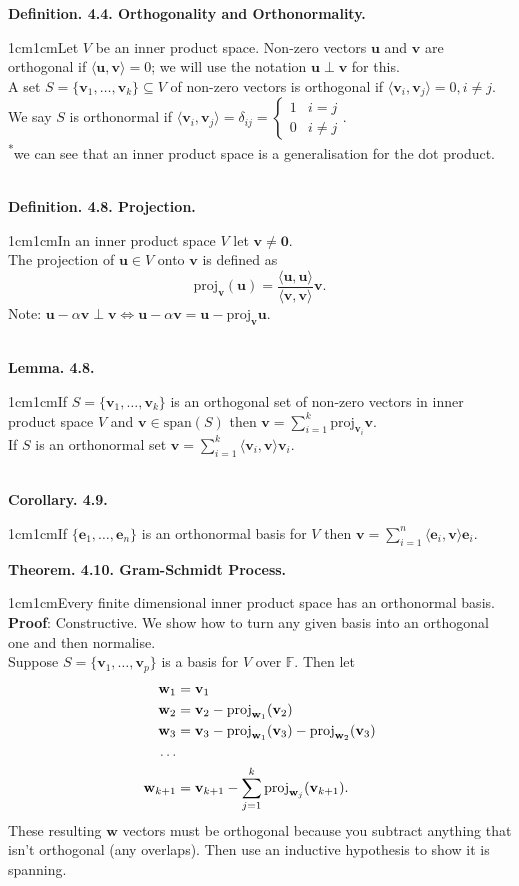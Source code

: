 \documentclass{article}
\newcommand{\vect}[1]{\mathbf{#1}}
\newcommand{\definition}[2]{\textbf{Definition. #1.}\begin{adjustwidth}{1cm}{1cm}#2\end{adjustwidth}}
\newcommand{\theorem}[2]{\textbf{Theorem. #1.}\begin{adjustwidth}{1cm}{1cm}#2\end{adjustwidth}}
\newcommand{\lemma}[2]{\textbf{Lemma. #1.}\begin{adjustwidth}{1cm}{1cm}#2\end{adjustwidth}}
\newcommand{\corollary}[2]{\textbf{Corollary. #1.}\begin{adjustwidth}{1cm}{1cm}#2\end{adjustwidth}}
\begin{document}
\definition{4.4. Orthogonality and Orthonormality}{Let $V$ be an inner product space. Non-zero vectors $\vect{u}$ and $\vect{v}$ are orthogonal if $\langle \vect{u}, \vect{v} \rangle = 0$; we will use the notation $\vect{u} \perp \vect{v}$ for this.\\A set $S = \{ \vect{v}_1, \ldots , \vect{v}_k \} \subseteq V$ of non-zero vectors is orthogonal if $\langle \vect{v}_i, \vect{v}_j \rangle = 0, i \neq j$.\\We say $S$ is orthonormal if $\langle \vect{v}_i, \vect{v}_j \rangle = \delta_{ij} = \begin{cases} 1 & i=j \\ 0 & i \neq j \end{cases}$.\\[1\baselineskip]\textsuperscript{*}we can see that an inner product space is a generalisation for the dot product.}~\\
\definition{4.8. Projection}{In an inner product space $V$ let $\vect{v} \neq \vect{0}$.\\The projection of $\vect{u} \in V$ onto $\vect{v}$ is defined as \[ \text{proj}_\vect{v}(\vect{u}) = \frac{\langle \vect{u}, \vect{u} \rangle}{\langle \vect{v}, \vect{v} \rangle} \vect{v}.\]Note: $\vect{u} - \alpha \vect{v} \perp \vect{v} \iff \vect{u} - \alpha \vect{v} = \vect{u} - \text{proj}_\vect{v} \vect{u}$.}~\\
\lemma{4.8}{If $S = \{ \vect{v}_1, \ldots, \vect{v}_k \}$ is an orthogonal set of non-zero vectors in inner product space $V$ and $\vect{v} \in \text{span}(S)$ then $\vect{v} = \sum_{i=1}^k \text{proj}_{\vect{v}_i} \vect{v}$.\\If $S$ is an orthonormal set $\vect{v} = \sum_{i=1}^k \langle \vect{v}_i, \vect{v} \rangle \vect{v}_i$.}~\\
\corollary{4.9}{If $\{ \vect{e}_1, \ldots , \vect{e}_n \}$ is an orthonormal basis for $V$ then $\vect{v} = \sum_{i=1}^n \langle \vect{e}_i, \vect{v} \rangle \vect{e}_i$.}\newpage
\theorem{4.10. Gram-Schmidt Process}{Every finite dimensional inner product space has an orthonormal basis.\\\textbf{Proof}: Constructive. We show how to turn any given basis into an orthogonal one and then normalise.\\[1\baselineskip]
Suppose $S = \{ \vect{v}_1, \ldots, \vect{v}_p \}$ is a basis for $V$ over $\mathbb{F}$. Then let
\begin{align*}
  \vect{w}_1 &= \vect{v}_1 \notag \\
  \vect{w}_2 &= \vect{v}_2 - \text{proj}_{\vect{w}_1}(\vect{v}_2) \notag \\
  \vect{w}_3 &= \vect{v}_3 - \text{proj}_{\vect{w}_1}(\vect{v}_3) - \text{proj}_{\vect{w}_2}(\vect{v}_3) \notag \\
  \ldots \notag \\
  \vect{w}_{k+1} &= \vect{v}_{k+1} - \sum_{j=1}^k \text{proj}_{\vect{w}_j} (\vect{v}_{k+1}). \notag
\end{align*}
These resulting $\vect{w}$ vectors must be orthogonal because you subtract anything that isn't orthogonal (any overlaps). Then use an inductive hypothesis to show it is spanning.}~\\
\end{document}
